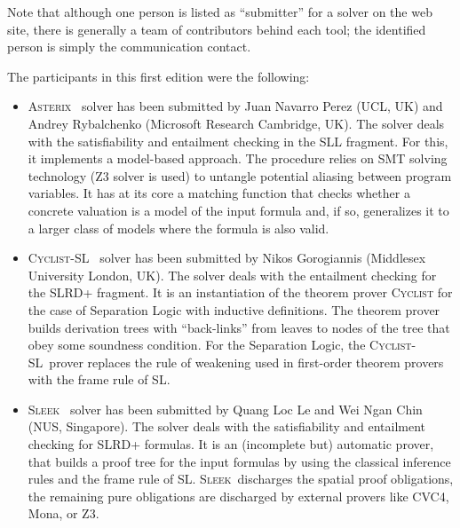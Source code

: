 \documentclass[twoside,11pt]{article}
\newcommand{\ASTERIX}{\textsc{Asterix}}
\newcommand{\CYCLIST}{\textsc{Cyclist-SL}}
\newcommand{\SLEEK}{\textsc{Sleek}}
\begin{document}
Note that although one person is listed as ``submitter'' for a solver on the web site,
there is generally a team of contributors behind each tool; the identified person is simply the communication contact.

The participants in this first edition were the following:


\begin{itemize}
\item \ASTERIX~\cite{PerezR13} 
solver has been submitted by 
Juan Navarro Perez (UCL, UK) and 
Andrey Rybalchenko (Microsoft Research Cambridge, UK).
The solver deals with the satisfiability and entailment checking in the SLL fragment.
For this, it implements a model-based approach.
The procedure relies on SMT solving technology (Z3 solver is used) to untangle potential aliasing between program variables. 
It has at its core a matching function that checks whether a concrete valuation is a model of the input formula and, if so, generalizes it to a larger class of models where the formula is also valid.  


\item \CYCLIST~\cite{BrotherstonGP12,CYCLISTsite}
solver has been submitted by 
Nikos Gorogiannis (Middlesex University London, UK).
The solver deals with the entailment checking for the SLRD+ fragment.
It is an instantiation of the theorem prover \textsc{Cyclist} for the case of Separation Logic with inductive definitions. 
The theorem prover builds derivation trees with ``back-links'' from leaves to nodes of the tree that obey some soundness condition. 
For the Separation Logic, the \CYCLIST\ prover replaces the rule of weakening used in first-order theorem provers with the frame rule of SL.


\item \SLEEK~\cite{ChinDNQ12,SLEEKsite} 
solver has been submitted by 
Quang Loc Le and Wei Ngan Chin (NUS, Singapore).
The solver deals with the satisfiability and entailment checking for SLRD+ formulas.
It is an (incomplete but) automatic prover, that builds a proof tree for the input formulas by using the classical inference rules and the frame rule of SL.
%
\SLEEK\ discharges the spatial proof obligations, the remaining pure obligations are discharged by external provers like CVC4, Mona, or Z3.



\end{itemize}
\end{document}
